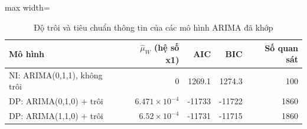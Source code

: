 \begin{table}[H]
\centering\footnotesize
\caption{Độ trôi và tiêu chuẩn thông tin của các mô hình ARIMA đã khớp}\label{tab:tab_b12_05_fit_stats}
\begin{adjustbox}{max width=\linewidth}
\begin{tabular}{|l|r|r|r|r|}
\toprule
Mô hình & $\hat{\mu}_{W}$ (hệ số x1) & AIC & BIC & Số quan sát \\
\midrule
NI: ARIMA(0,1,1), không trôi & 0 & 1269.1 & 1274.3 & 100 \\
DP: ARIMA(0,1,0) + trôi & $6.471\times10^{-4}$ & -11733 & -11722 & 1860 \\
DP: ARIMA(1,1,0) + trôi & $6.52\times10^{-4}$ & -11731 & -11715 & 1860 \\
\bottomrule
\end{tabular}
\end{adjustbox}\par{}
\end{table}
